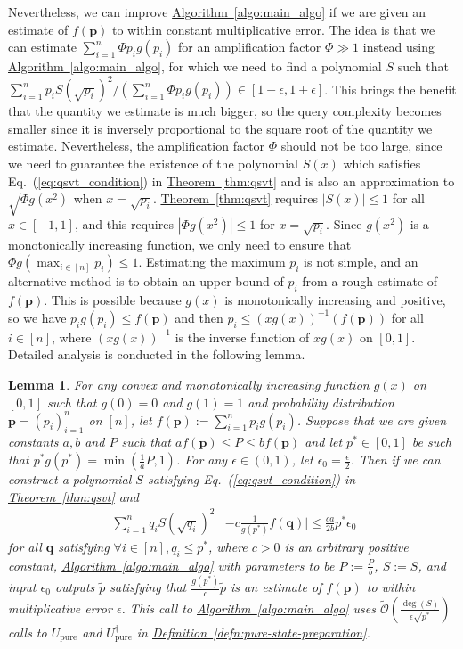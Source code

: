 \documentclass[journal]{IEEEtran}
\newtheorem{lemma}{Lemma}
\newcommand{\eq}[1]{Eq.~(\ref{eq:#1})}
\newcommand{\thm}[1]{\hyperref[thm:#1]{Theorem~\ref*{thm:#1}}}
\newcommand{\defn}[1]{\hyperref[defn:#1]{Definition~\ref*{defn:#1}}}
\newcommand{\algo}[1]{\hyperref[algo:#1]{Algorithm~\ref*{algo:#1}}}
\begin{document}
Nevertheless, we can improve \algo{main_algo} if we are given an estimate of $f(\mathbf{p})$ to within constant multiplicative error. The idea is that we can estimate $\sum_{i=1}^n \Phi p_i g(p_i)$ for an amplification factor $\Phi \gg 1$ instead using \algo{main_algo}, for which we need to find a polynomial $S$ such that $\sum_{i=1}^n p_i S(\sqrt{p_i})^2/(\sum_{i=1}^n \Phi p_i g(p_i))\in [1-\epsilon,1+\epsilon]$. This brings the benefit that the quantity we estimate is much bigger, so the query complexity becomes smaller since it is inversely proportional to the square root of the quantity we estimate. Nevertheless, the amplification factor $\Phi$ should not be too large, since we need to guarantee the existence of the polynomial $S(x)$ which satisfies \eq{qsvt_condition} in \thm{qsvt} and is also an approximation to $\sqrt{\Phi g(x^2)}$ when $x = \sqrt{p_i}$. \thm{qsvt} requires $|S(x)|\le 1$ for all $x\in[-1,1]$, and this requires $|\Phi g(x^2)|\le 1$ for $x = \sqrt{p_i}$. Since $g(x^2)$ is a monotonically increasing function, we only need to ensure that $\Phi g(\max_{i\in[n]}p_i) \le 1$. Estimating the maximum $p_i$ is not simple, and an alternative method is to obtain an upper bound of $p_i$ from a rough estimate of $f(\mathbf{p})$. This is possible because $g(x)$ is monotonically increasing and positive, so we have $p_ig(p_i) \le f(\mathbf{p})$ and then $p_i\le (xg(x))^{-1}(f(\mathbf{p}))$ for all $i\in [n]$, where $(xg(x))^{-1}$ is the inverse function of $xg(x)$ on $[0,1]$. Detailed analysis is conducted in the following lemma.
\begin{lemma}
\label{lem:annealing_pre}
  For any convex and monotonically increasing function $g(x)$ on $[0,1]$ such that $g(0) = 0$ and $g(1) = 1$ and probability distribution $\mathbf{p} = (p_i)_{i=1}^n$ on $[n]$, let $f(\mathbf{p}):=\sum_{i=1}^n p_i g(p_i)$. Suppose that we are given constants $a,b$ and $P$ such that $af(\mathbf{p}) \le P \le b f(\mathbf{p})$ and let $p^{*}\in[0,1]$ be such that $p^{*}g(p^{*})  = \min(\frac{1}{a}P,1)$. For any $\epsilon\in(0,1)$, let $\epsilon_0 = \frac{\epsilon}{2}$. Then if we can construct a polynomial $S$ satisfying \eq{qsvt_condition} in \thm{qsvt} and
  \begin{align}
  \label{eq:annealing_pre}
      \Big|\sum_{i=1}^n q_i S(\sqrt{q_i})^2 &- c\frac{1}{g(p^*)}f(\mathbf{q})\Big| \le \frac{ca}{2b} p^{*}\epsilon_0 %
  \end{align}
  for all $\mathbf{q}$ satisfying $\forall i \in[n], q_i\le p^*$, where $c> 0$ is an arbitrary positive constant, \algo{main_algo} with parameters to be $P:=\frac{P}{b}$, $S:=S$, and input $\epsilon_0$ outputs $\tilde{p}$ satisfying that $\frac{g(p^*)}{c}\tilde{p}$ is an estimate of $f(\mathbf{p})$ to within  multiplicative error $\epsilon$. This call to \algo{main_algo} uses $\widetilde{\mathcal{O}}\left(\frac{\deg(S)}{\epsilon\sqrt{p^{*}}}\right)$ calls to $U_{\mathrm{pure}}$ and $U_{\mathrm{pure}}^{\dagger}$ in \defn{pure-state-preparation}.
\end{lemma}
\end{document}
